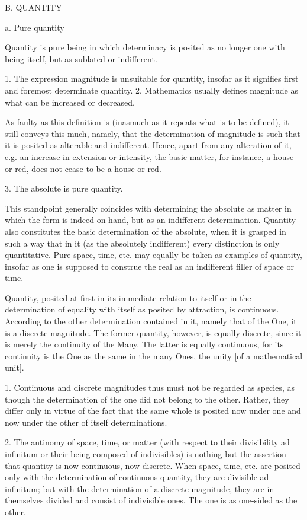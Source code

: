 B. QUANTITY

a. Pure quantity

Quantity is pure being in which determinacy is posited as
no longer one with being itself, but as sublated or indifferent.

1. The expression magnitude is unsuitable for quantity,
insofar as it signifies first and foremost determinate quantity.
2. Mathematics usually defines magnitude
as what can be increased or decreased.

As faulty as this definition is
(inasmuch as it repeats what is to be defined),
it still conveys this much, namely,
that the determination of magnitude is such that
it is posited as alterable and indifferent.
Hence, apart from any alteration of it,
e.g. an increase in extension or intensity,
the basic matter, for instance, a house or red,
does not cease to be a house or red.

3. The absolute is pure quantity.

This standpoint generally coincides
with determining the absolute as matter
in which the form is indeed on hand,
but as an indifferent determination.
Quantity also constitutes the basic
determination of the absolute,
when it is grasped in such a way
that in it (as the absolutely indifferent)
every distinction is only quantitative.
Pure space, time, etc. may equally
be taken as examples of quantity,
insofar as one is supposed to construe
the real as an indifferent filler of space or time.

Quantity, posited at first in
its immediate relation to itself
or in the determination of equality with itself
as posited by attraction, is continuous.
According to the other determination contained in it,
namely that of the One, it is a discrete magnitude.
The former quantity, however, is equally discrete,
since it is merely the continuity of the Many.
The latter is equally continuous,
for its continuity is the One
as the same in the many Ones,
the unity [of a mathematical unit].

1. Continuous and discrete magnitudes
thus must not be regarded as species,
as though the determination of the one
did not belong to the other.
Rather, they differ only in virtue
of the fact that the same whole is
posited now under one and now under
the other of itself determinations.

2. The antinomy of space, time, or matter
(with respect to their divisibility ad infinitum
or their being composed of indivisibles)
is nothing but the assertion that quantity is
now continuous, now discrete.
When space, time, etc. are posited only with
the determination of continuous quantity,
they are divisible ad infinitum;
but with the determination of a discrete magnitude,
they are in themselves divided
and consist of indivisible ones.
The one is as one-sided as the other.

